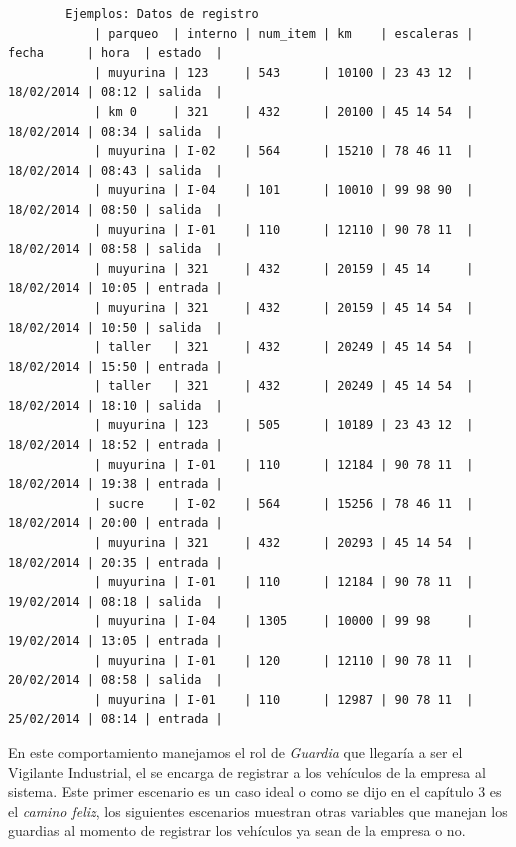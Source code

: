 {\scriptsize
\begin{verbatim}
        Ejemplos: Datos de registro
            | parqueo  | interno | num_item | km    | escaleras | fecha      | hora  | estado  |
            | muyurina | 123     | 543      | 10100 | 23 43 12  | 18/02/2014 | 08:12 | salida  |
            | km 0     | 321     | 432      | 20100 | 45 14 54  | 18/02/2014 | 08:34 | salida  |
            | muyurina | I-02    | 564      | 15210 | 78 46 11  | 18/02/2014 | 08:43 | salida  |
            | muyurina | I-04    | 101      | 10010 | 99 98 90  | 18/02/2014 | 08:50 | salida  |
            | muyurina | I-01    | 110      | 12110 | 90 78 11  | 18/02/2014 | 08:58 | salida  |
            | muyurina | 321     | 432      | 20159 | 45 14     | 18/02/2014 | 10:05 | entrada |
            | muyurina | 321     | 432      | 20159 | 45 14 54  | 18/02/2014 | 10:50 | salida  |
            | taller   | 321     | 432      | 20249 | 45 14 54  | 18/02/2014 | 15:50 | entrada |
            | taller   | 321     | 432      | 20249 | 45 14 54  | 18/02/2014 | 18:10 | salida  |
            | muyurina | 123     | 505      | 10189 | 23 43 12  | 18/02/2014 | 18:52 | entrada |
            | muyurina | I-01    | 110      | 12184 | 90 78 11  | 18/02/2014 | 19:38 | entrada |
            | sucre    | I-02    | 564      | 15256 | 78 46 11  | 18/02/2014 | 20:00 | entrada |
            | muyurina | 321     | 432      | 20293 | 45 14 54  | 18/02/2014 | 20:35 | entrada |
            | muyurina | I-01    | 110      | 12184 | 90 78 11  | 19/02/2014 | 08:18 | salida  |
            | muyurina | I-04    | 1305     | 10000 | 99 98     | 19/02/2014 | 13:05 | entrada |
            | muyurina | I-01    | 120      | 12110 | 90 78 11  | 20/02/2014 | 08:58 | salida  |
            | muyurina | I-01    | 110      | 12987 | 90 78 11  | 25/02/2014 | 08:14 | entrada |
\end{verbatim}
}

En este comportamiento manejamos el rol de {\it Guardia} que llegaría a ser el Vigilante
Industrial, el se encarga de registrar a los vehículos de la empresa al sistema.
Este primer escenario es un caso ideal o como se dijo en el capítulo 3 es el
{\it camino feliz}, los siguientes escenarios muestran otras variables que manejan
los guardias al momento de registrar los vehículos ya sean de la empresa o no.

